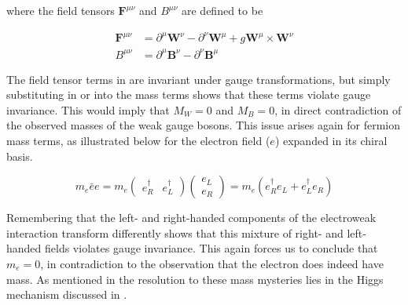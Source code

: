 where the field tensors $\boldsymbol{F}^{\mu\nu}$ and $B^{\mu\nu}$ are defined
to be

\begin{align}
\boldsymbol{F}^{\mu\nu}  &= \partial^{\mu}\boldsymbol{W}^{\nu} -
\partial^{\nu}\boldsymbol{W}^{\mu} + g\boldsymbol{W}^{\mu} \times
\boldsymbol{W}^{\nu} \\
B^{\mu\nu} &=  \partial^{\mu}\boldsymbol{B}^{\nu} -
\partial^{\nu}\boldsymbol{B}^{\mu}
\end{align}

The field tensor terms in  are invariant under
gauge transformations, but simply substituting in  or
 into the mass terms shows that these terms violate gauge
invariance. This would imply that $M_{W} = 0$ and $M_{B} = 0$, in direct
contradiction of the observed masses of the weak gauge bosons.  This issue
arises again for fermion mass terms, as illustrated below for the electron field
($e$) expanded in its chiral basis.

\begin{equation}
m_{e}\bar{e}e = m_{e} \left( \begin{matrix}e^{\dagger}_{R} &
e^{\dagger}_{L} \end{matrix} \right) \left( \begin{matrix} e_{L}
\\ e_{R} \end{matrix} \right) = m_{e}(e^{\dagger}_{R}e_{L} +
e^{\dagger}_{L}e_{R})
\end{equation}

Remembering that the left- and right-handed components of the electroweak
interaction transform differently shows that this mixture of right- and left-
handed fields violates gauge invariance. This again forces us to conclude that
$m_{e} = 0$, in contradiction to the observation that the electron does indeed
have mass. As mentioned in  the resolution to these
mass mysteries lies in the Higgs mechanism discussed in .

